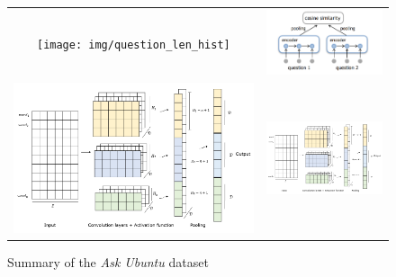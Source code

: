 \documentclass{sigkddExp}
\begin{document}
\begin{figure}[h]
\centering
\begin{tabular}{cc}
    \texttt{[image: img/question\_len\_hist]}
&   \includegraphics[width=\columnwidth]{img/similar}
\\
   \includegraphics[width=\columnwidth]{img/cnn}
&   \includegraphics[width=\columnwidth]{img/cnn}
\end{tabular}
\label{fig:len_hist}
\caption{Summary of the \textit{Ask Ubuntu} dataset}
\end{figure}
\end{document}
